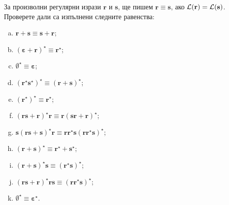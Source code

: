 \begin{extra}
\begin{problem}
  За произволни регулярни изрази $\bm{r}$ и $\bm{s}$, ще пишем $\bm{r} \equiv \bm{s}$, ако $\mathcal{L}(\bf{r}) = \mathcal{L}(\bm{s})$.
  Проверете дали са изпълнени следните равенства:
  \begin{enumerate}[a)]
  \item 
    $\bm{r + s} \equiv \bm{s + r}$;
  \item
    $\bm{(\varepsilon + r)^\star} \equiv \bm{r^\star}$;
  \item
    $\bm{\emptyset^\star} \equiv \bm{\varepsilon}$;
  \item
    $\bm{(r^\star s^\star)^\star} \equiv \bm{(r+s)^\star}$;
  \item
    $\bm{(r^\star)^\star} \equiv \bm{r^\star}$;
  \item
    $\bm{(rs + r)^\star r} \equiv \bm{r(sr+r)^\star}$;
  \item
    $\bm{s(rs+s)^\star r} \equiv \bm{rr^\star s(rr^\star s)^\star}$;
  \item
    $\bm{(r+s)^\star} \equiv \bm{r^\star + s^\star}$;
  \item
    $\bm{(r+s)^\star s} \equiv \bm{(r^\star s)^\star}$;
  \item
    $\bm{(rs + r)^\star rs} \equiv \bm{(rr^\star s)^\star}$;
  \item
    $\bm{\emptyset^\star} \equiv \bm{\varepsilon^\star}$.
  \end{enumerate}
\end{problem}
\end{extra}


